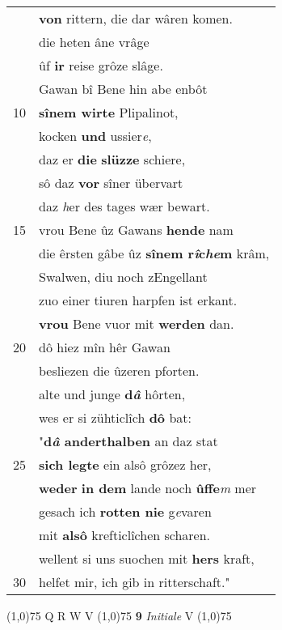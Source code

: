 \documentclass[8pt,a4paper,notitlepage]{article}
\begin{document}
\begin{table}[ht]
\begin{minipage}[t]{0.5\linewidth}
\begin{tabular}{rl}
 & \textbf{von} rittern, die dar wâren komen.\\ 
 & die heten âne vrâge\\ 
 & ûf \textbf{ir} reise grôze slâge.\\ 
 & Gawan bî Bene hin abe enbôt\\ 
10 & \textbf{sînem wirte} Plipalinot,\\ 
 & kocken \textbf{und} ussier\textit{e},\\ 
 & daz er \textbf{die} \textbf{slüzze} schiere,\\ 
 & sô daz \textbf{vor} sîner übervart\\ 
 & daz \textit{h}er des tages wær bewart.\\ 
15 & vrou Bene ûz Gawans \textbf{hende} nam\\ 
 & die êrsten gâbe ûz \textbf{sînem r\textit{î}c\textit{he}m} krâm,\\ 
 & Swalwen, diu noch zEngellant\\ 
 & zuo einer tiuren harpfen ist erkant.\\ 
 & \textbf{vrou} Bene vuor mit \textbf{werden} dan.\\ 
20 & dô hiez mîn hêr Gawan\\ 
 & besliezen die ûzeren pforten.\\ 
 & alte und junge \textbf{d\textit{â}} hôrten,\\ 
 & wes er si zühticlîch \textbf{dô} bat:\\ 
 & "\textbf{d\textit{â} anderthalben} an daz stat\\ 
25 & \textbf{sich legte} ein alsô grôzez her,\\ 
 & \textbf{weder} \textbf{in dem} lande noch \textbf{ûffe}\textit{m} mer\\ 
 & gesach ich \textbf{rotten nie} g\textit{e}varen\\ 
 & mit \textbf{alsô} krefticlîchen scharen.\\ 
 & wellent si uns suochen mit \textbf{hers} kraft,\\ 
30 & helfet mir, ich gib in ritterschaft."\\ 
\end{tabular}
\scriptsize
\line(1,0){75} \newline
Q R W V \newline
\line(1,0){75} \newline
\textbf{9} \textit{Initiale} V  \newline
\line(1,0){75} \newline

\end{minipage}
\end{table}
\end{document}
